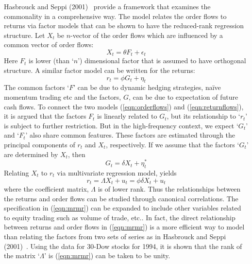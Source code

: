 Hasbrouck and Seppi (2001)~\cite{seppi2001} provide a framework that examines the commonality in a comprehensive way. The model relates the order flows to returns via factor models that can be shown to have the reduced-rank regression structure. Let $X_t$ be $n$-vector of the order flows which are influenced by a common vector of order flows:
	\begin{equation}\label{eqn:orderflows}
	X_t= \theta F_t + \epsilon_t
	\end{equation}
Here $F_t$ is lower (than `$n$') dimensional factor that is assumed to have orthogonal structure. A similar factor model can be written for the returns:
	\begin{equation}\label{eqn:returnflows}
	r_t= \phi G_t + \eta_t
	\end{equation}
The common factors `$F$' can be due to dynamic hedging strategies, na\"{i}ve momentum trading etc and the factors, $G$, can be due to expectation of future cash flows. To connect the two models (\ref{eqn:orderflows}) and (\ref{eqn:returnflows}), it is argued that the factors $F_t$ is linearly related to $G_t$, but its relationship to `$r_t$' is subject to further restriction. But in the high-frequency context, we expect `$G_t$' and `$F_t$' also share common features. These factors are estimated through the principal components of $r_t$ and $X_t$, respectively. If we assume that the factors `$G_t$' are determined by $X_t$, then
	\begin{equation}\label{eqn:determinedfactors}
	G_t= \delta X_t + \eta_t^*
	\end{equation}
Relating $X_t$ to $r_t$ via multivariate regression model, yields 
	\begin{equation}\label{eqn:mrmr}
	r_t= \Lambda X_t + u_t = \phi \delta X_t + u_t
	\end{equation}
where the coefficient matrix, $\Lambda$ is of lower rank. Thus the relationships between the returns and order flows can be studied through canonical correlations. The specification in (\ref{eqn:mrmr}) can be expanded to include other variables related to equity trading such as volume of trade, etc.. In fact, the direct relationship between returns and order flows in (\ref{eqn:mrmr}) is a more efficient way to model than relating the factors from two sets of series as in Hasbrouck and Seppi (2001)~\cite{seppi2001}. Using the data for 30-Dow stocks for 1994, it is shown that the rank of the matrix `$\Lambda$' is (\ref{eqn:mrmr}) can be taken to be unity. 


















